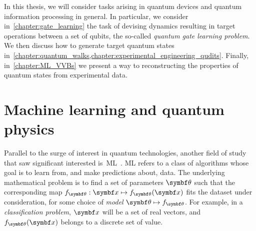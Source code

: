 In this thesis, we will consider tasks arising in quantum devices and quantum information processing in general.
In particular, we consider in~\cref{chapter:gate_learning} the task of devising dynamics resulting in target operations between a set of qubits, the so-called \emph{quantum gate learning problem}.
We then discuss how to generate target quantum states in~\cref{chapter:quantum_walks,chapter:experimental_engineering_qudits}.
Finally, in~\cref{chapter:ML_VVBs} we present a way to reconstructing the properties of quantum states from experimental data.

\section{Machine learning and quantum physics}
\label{sec:intro:ML}

Parallel to the surge of interest in quantum technologies, another field of study that saw significant interested is~\ac{ML}~\cite{friedman2001elements,you2011atomic,bishop2006pattern,abu2012learning,murphy2012machine,mehta2019highbias}.
\ac{ML} refers to a class of algorithms whose goal is to learn from, and make predictions about, data.
The underlying mathematical problem is to find a set of parameters $\bstheta$ such that the corresponding map $f_\bstheta:\bs x\mapsto f_\bstheta(\bs x)$ fits the dataset under consideration, for some choice of \emph{model} $\bstheta\mapsto f_\bstheta$.
For example, in a \emph{classification problem}, $\bs x$ will be a set of real vectors, and $f_\bstheta(\bs x)$ belongs to a discrete set of value.


